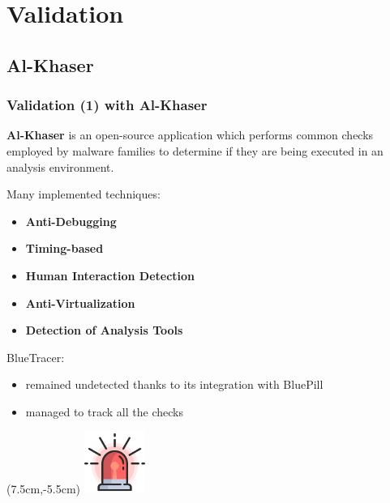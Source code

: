\documentclass[compress]{beamer}
\begin{document}
\section{Validation}

\subsection{Al-Khaser}
\begin{frame}
    \frametitle{Validation (1) with Al-Khaser}
    \begin{beamerboxesrounded}[shadow=true]{}
	\textbf{Al-Khaser} is an open-source application which performs common checks employed by malware families to determine if they are being
executed in an analysis environment.
\end{beamerboxesrounded}
\medskip
Many implemented techniques:
\begin{itemize}
\item \textbf{Anti-Debugging}
\item \textbf{Timing-based}
\item \textbf{Human Interaction Detection}
\item \textbf{Anti-Virtualization}
\item \textbf{Detection of Analysis Tools}
\end{itemize}
\medskip
\begin{beamerboxesrounded}[shadow=true]{}
BlueTracer: 
\begin{itemize}
\item remained undetected thanks to its integration with BluePill
\item managed to track all the checks
\end{itemize}
\end{beamerboxesrounded}

    \begin{textblock*}{3cm}(7.5cm,-5.5cm)
   \includegraphics[width=2cm]{image/lights.png}%
	\end{textblock*}

\end{frame}
\end{document}
